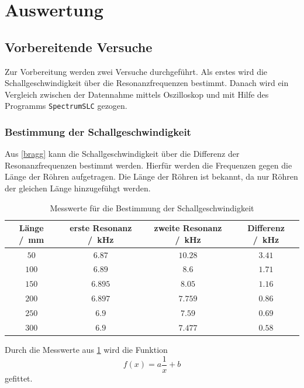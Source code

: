 \section{Auswertung}
\label{sec:Auswertung}
\subsection{Vorbereitende Versuche}
Zur Vorbereitung werden zwei Versuche durchgeführt. Als erstes wird die Schallgeschwindigkeit über die Resonanzfrequenzen bestimmt. Danach wird ein Vergleich
zwischen der Datennahme mittels Oszilloskop und mit Hilfe des Programms \texttt{SpectrumSLC} gezogen.
\subsubsection{Bestimmung der Schallgeschwindigkeit}
Aus \eqref{bragg} kann die Schallgeschwindigkeit über die Differenz der Resonanzfrequenzen
bestimmt werden. Hierfür werden die Frequenzen gegen die Länge der Röhren aufgetragen. Die Länge der Röhren ist bekannt, da nur Röhren 
der gleichen Länge hinzugefühgt werden.
\FloatBarrier
\begin{table}
    \centering
    \caption{Messwerte für die Bestimmung der Schallgeschwindigkeit}
    \label{tab:Schallgeschwindigkeit}
    \begin{tabular}{c c c c}
        \toprule
        Länge /\SI{}{\milli\meter}& erste Resonanz /\SI{}{\kilo\hertz} & zweite Resonanz /\SI{}{\kilo\hertz}& Differenz /\SI{}{\kilo\hertz}\\
        \midrule
        $\num{50}$&$\num{6.87}$&$\num{10.28}$&$\num{3.41}$\\
        $\num{100}$&$\num{6.89}$&$\num{8.6}$&$\num{1.71}$\\
        $\num{150}$&$\num{6.895}$&$\num{8.05}$&$\num{1.16}$\\
        $\num{200}$&$\num{6.897}$&$\num{7.759}$&$\num{0.86}$\\
        $\num{250}$&$\num{6.9}$&$\num{7.59}$&$\num{0.69}$\\
        $\num{300}$&$\num{6.9}$&$\num{7.477}$&$\num{0.58}$\\
        \bottomrule
    \end{tabular}
\end{table}
\FloatBarrier
Durch die Messwerte aus \ref{tab:Schallgeschwindigkeit} wird die Funktion
\begin{equation*}
    f(x) = a \frac{1}{x} + b
\end{equation*}
gefittet.\\
